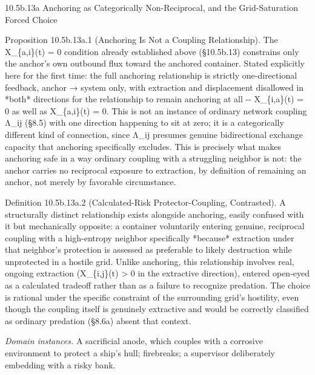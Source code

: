 \documentclass[
]{article}
\begin{document}
10.5b.13a Anchoring as Categorically Non-Reciprocal, and the
Grid-Saturation Forced Choice

Proposition 10.5b.13a.1 (Anchoring Is Not a Coupling Relationship). The
X\_\{a,i\}(t) = 0 condition already established above (§10.5b.13)
constrains only the anchor's own outbound flux toward the anchored
container. Stated explicitly here for the first time: the full anchoring
relationship is strictly one-directional feedback, anchor → system only,
with extraction and displacement disallowed in *both* directions for the
relationship to remain anchoring at all -\/- X\_\{i,a\}(t) = 0 as well
as X\_\{a,i\}(t) = 0. This is not an instance of ordinary network
coupling Λ\_ij (§8.5) with one direction happening to sit at zero; it is
a categorically different kind of connection, since Λ\_ij presumes
genuine bidirectional exchange capacity that anchoring specifically
excludes. This is precisely what makes anchoring safe in a way ordinary
coupling with a struggling neighbor is not: the anchor carries no
reciprocal exposure to extraction, by definition of remaining an anchor,
not merely by favorable circumstance.

Definition 10.5b.13a.2 (Calculated-Risk Protector-Coupling, Contrasted).
A structurally distinct relationship exists alongside anchoring, easily
confused with it but mechanically opposite: a container voluntarily
entering genuine, reciprocal coupling with a high-entropy neighbor
specifically *because* extraction under that neighbor's protection is
assessed as preferable to likely destruction while unprotected in a
hostile grid. Unlike anchoring, this relationship involves real, ongoing
extraction (X\_\{i,j\}(t) \textgreater{} 0 in the extractive direction),
entered open-eyed as a calculated tradeoff rather than as a failure to
recognize predation. The choice is rational under the specific
constraint of the surrounding grid's hostility, even though the coupling
itself is genuinely extractive and would be correctly classified as
ordinary predation (§8.6a) absent that context.

\emph{Domain instances.} A sacrificial anode, which couples with a
corrosive environment to protect a ship's hull; firebreaks; a supervisor
deliberately embedding with a risky bank.
\end{document}
